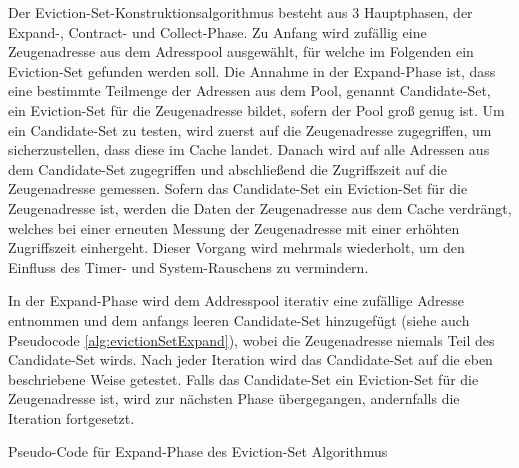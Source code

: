Der Eviction-Set-Konstruktionsalgorithmus besteht aus 3 Hauptphasen, der Expand-, Contract- und Collect-Phase. 
Zu Anfang wird zufällig eine Zeugenadresse aus dem Adresspool ausgewählt, für welche im Folgenden ein Eviction-Set gefunden werden soll.
Die Annahme in der Expand-Phase ist, dass eine bestimmte Teilmenge der Adressen aus dem Pool, genannt Candidate-Set, ein Eviction-Set für die Zeugenadresse bildet, sofern der Pool groß genug ist. 
Um ein Candidate-Set zu testen, wird zuerst auf die Zeugenadresse zugegriffen, um sicherzustellen, dass diese im Cache landet.
Danach wird auf alle Adressen aus dem Candidate-Set zugegriffen und abschließend die Zugriffszeit auf die Zeugenadresse gemessen. 
Sofern das Candidate-Set ein Eviction-Set für die Zeugenadresse ist, werden die Daten der Zeugenadresse aus dem Cache verdrängt, welches bei einer erneuten Messung der Zeugenadresse mit einer erhöhten Zugriffszeit einhergeht.
Dieser Vorgang wird mehrmals wiederholt, um den Einfluss des Timer- und System-Rauschens zu vermindern.

In der Expand-Phase wird dem Addresspool iterativ eine zufällige Adresse entnommen und dem anfangs leeren Candidate-Set hinzugefügt (siehe auch Pseudocode \ref{alg:evictionSetExpand}), wobei die Zeugenadresse niemals Teil des Candidate-Set wirds.
Nach jeder Iteration wird das Candidate-Set auf die eben beschriebene Weise getestet.
Falls das Candidate-Set ein Eviction-Set für die Zeugenadresse ist, wird zur nächsten Phase übergegangen, andernfalls die Iteration fortgesetzt.

\begin{algorithm}[h]
\DontPrintSemicolon
\caption{Pseudo-Code für Expand-Phase des Eviction-Set Algorithmus}
\label{alg:evictionSetExpand}

\end{algorithm}

